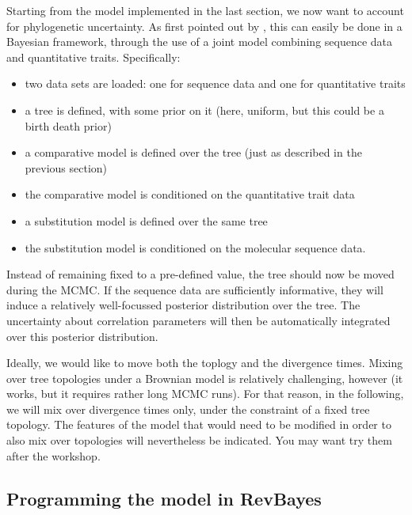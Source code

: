 \documentclass[usletter]{article}
\begin{document}
Starting from the model implemented in the last section, we now want to account for phylogenetic uncertainty. As first pointed out by \cite{Huelsenbeck:2003p999}, this can easily be done in a Bayesian framework, through the use of a joint model combining sequence data and quantitative traits. Specifically:
\begin{itemize}
\item
two data sets are loaded: one for sequence data and one for quantitative traits
\item
a tree is defined, with some prior on it (here, uniform, but this could be a birth death prior)
\item
a comparative model is defined over the tree (just as described in the previous section)
\item
the comparative model is conditioned on the quantitative trait data
\item
a substitution model is defined over the same tree
\item
the substitution model is conditioned on the molecular sequence data.
\end{itemize}
Instead of remaining fixed to a pre-defined value,
the tree should now be moved during the MCMC.
If the sequence data are sufficiently informative, they will induce a relatively well-focussed posterior distribution
over the tree.
The uncertainty about correlation parameters
will then be automatically integrated over this posterior distribution.

Ideally, we would like to move both the toplogy and the divergence times.
Mixing over tree topologies under a Brownian model is relatively challenging, however
(it works, but it requires rather long MCMC runs).
For that reason, in the following, we will mix over divergence times only,
under the constraint of a fixed tree topology.
The features of the model that would need to be modified in order to also mix over topologies
will nevertheless be indicated. You may want try them after the workshop.

\subsection*{Programming the model in RevBayes}
\end{document}

